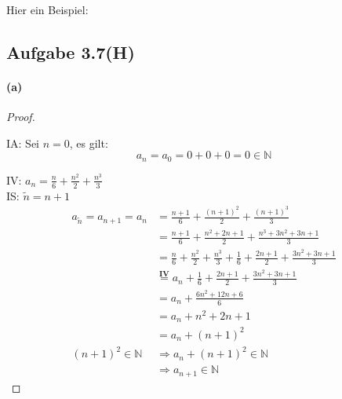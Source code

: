 Hier ein Beispiel:

\begin{figure}[h]
\centering
{
\fboxsep=0pt
\fboxrule=3pt
}
\end{figure}

\newpage

\subsection{Aufgabe 3.7(H)}

\paragraph{(a)}
\begin{proof}
$ $\newline

IA: Sei $n=0$, es gilt:
\begin{equation*}
a_n=a_0=0+0+0=0\in\mathbb{N}
\end{equation*}

IV: $a_n=\frac{n}{6}+\frac{n^2}{2}+\frac{n^3}{3}$\\

IS: $\tilde{n}=n+1$\\
\begin{align*}
a_{\tilde{n}}=a_{n+1}=a_n
&=\frac{n+1}{6}+\frac{(n+1)^2}{2}+\frac{(n+1)^3}{3}\\
&=\frac{n+1}{6}+\frac{n^2+2n+1}{2}+\frac{n^3+3n^2+3n+1}{3}\\
&=\frac{n}{6}+\frac{n^2}{2}+\frac{n^3}{3}+\frac{1}{6}+\frac{2n+1}{2}+\frac{3n^2+3n+1}{3}\\
&\overset{\mathbf{IV}}{=}a_n+\frac{1}{6}+\frac{2n+1}{2}+\frac{3n^2+3n+1}{3}\\
&=a_n+\frac{6n^2+12n+6}{6}\\
&=a_n+n^2+2n+1\\
&=a_n+(n+1)^2\\
(n+1)^2\in\mathbb{N}&\Rightarrow a_n+(n+1)^2\in\mathbb{N}\\
&\Rightarrow a_{n+1}\in\mathbb{N}
\end{align*}
\end{proof}

